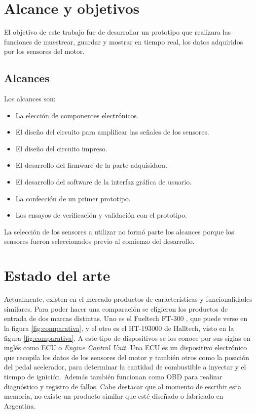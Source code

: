 \section{Alcance y objetivos}

El objetivo de este trabajo fue de desarrollar un prototipo que realizara las funciones de muestrear, guardar y mostrar en tiempo real, los datos adquiridos por los sensores del motor.

\subsection{Alcances}

Los alcances son:
\begin{itemize}
\item La elección de componentes electrónicos.
\item El diseño del circuito para amplificar las señales de los sensores.
\item El diseño del circuito impreso.
\item El desarrollo del firmware de la parte adquisidora.
\item El desarrollo del software de la interfaz gráfica de usuario.
\item La confección de un primer prototipo.
\item Los ensayos de verificación y validación con el prototipo.
\end{itemize}

La selección de los sensores a utilizar no formó parte los alcances porque los sensores fueron seleccionados previo al comienzo del desarrollo.

\section{Estado del arte}

Actualmente, existen en el mercado productos de características y funcionalidades similares. Para poder hacer una comparación se eligieron los productos de entrada de dos marcas distintas. Uno es el Fueltech FT-300 \citep{ft-300}, que puede verse en la figura \ref{fig:comparativa},  y el otro es el HT-193000 \citep{ht-193000} de Halltech, visto en la figura \ref{fig:comparativa}. A este tipo de dispositivos se los conoce por sus siglas en inglés como ECU o \textit{Engine Control Unit}. Una ECU es un dispositivo electrónico que recopila los datos de los sensores del motor y también otros como la posición del pedal acelerador, para determinar la cantidad de combustible a inyectar y el tiempo de ignición. Además también funcionan como OBD para realizar diagnóstico y registro de fallos. Cabe destacar que al momento de escribir esta memoria, no existe un producto similar que esté diseñado o fabricado en Argentina.

